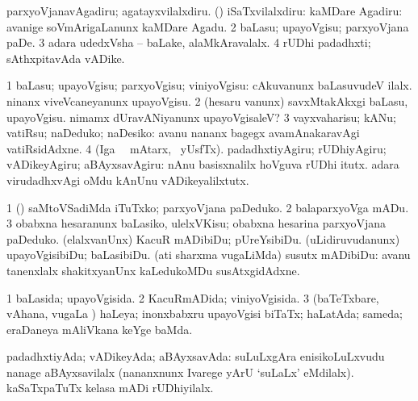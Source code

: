 \noindent
\gl{\pagu}
\expl{}
\bmng
\bnum
{}  
\banum
{} parxyoVjanavAgadiru; agatayxvilalxdiru. 
 (\rUpa) iSaTxvilalxdiru: kaMDare Agadiru:  avanige soVmArigaLanunx kaMDare Agadu. 
\eanum
\numie
\num{2}  baLasu; upayoVgisu; parxyoVjana paDe. 
\num{3}  adara udedxVsha -- baLake, alaMkAravalalx. 
\num{4}  rUDhi padadhxti; sAthxpitavAda vADike. 
\enum
\emng
\eentry

\bentry
{} 
\gl{\sakirx}
\expl{}
\bmng
\bnum
\num{1} baLasu; upayoVgisu; parxyoVgisu; viniyoVgisu:  cAkuvanunx baLasuvudeV ilalx.  ninanx viveVcaneyanunx upayoVgisu. 
\num{2} (hesaru \mo vanunx) savxMtakAkxgi baLasu, upayoVgisu.  nimamx dUravANiyanunx upayoVgisaleV? 
\num{3} vayxvaharisu; kANu; vatiRsu; naDeduko; naDesiko:  avanu nananx bagegx avamAnakaravAgi vatiRsidAdxne. 
\num{4} (Iga \sA\ \BU\ mAtarx, \ucAcx\ yUsfTx). padadhxtiyAgiru; rUDhiyAgiru; vADikeyAgiru; aBAyxsavAgiru:  nAnu basisxnalilx hoVguva rUDhi itutx.  adara virudadhxvAgi oMdu kAnUnu vADikeyalilxtutx. 
\enum
\emng

\noindent
\gl{\pagu}
\expl{}
\bmng
\bnum
\num{1}  (\AmA) saMtoVSadiMda iTuTxko; parxyoVjana paDeduko. 
\num{2}  balaparxyoVga mADu. 
\num{3}  obabxna hesaranunx baLasiko, ulelxVKisu; obabxna hesarina parxyoVjana paDeduko.
  
\banum
{} (elalxvanUnx) KacuR mADibiDu; pUreYsibiDu. 
 (uLidiruvudanunx) upayoVgisibiDu; baLasibiDu. 
 (ati sharxma \mo vugaLiMda) susutx mADibiDu:  avanu tanenxlalx shakitxyanUnx kaLedukoMDu susAtxgidAdxne. 
\eanum
\numie
\enum
\emng
\eentry

\bentry
{} 
\gl{\gu}
\bmng
\bnum
\num{1} baLasida; upayoVgisida. 
\num{2} KacuRmADida; viniyoVgisida. 
\num{3} (baTeTxbare, vAhana, \mo vugaLa \vi) haLeya; inonxbabxru upayoVgisi biTaTx; haLatAda; sameda; eraDaneya mAliVkana keYge baMda. 
\enum
\emng

\noindent 
\gl{\pagu}
\expl{}
\bmng
{} padadhxtiyAda; vADikeyAda; aBAyxsavAda:  suLuLxgAra enisikoLuLxvudu nanage aBAyxsavilalx (nananxnunx Ivarege yArU `suLaLx' eMdilalx).  kaSaTxpaTuTx kelasa mADi rUDhiyilalx. 
\emng
\eentry

